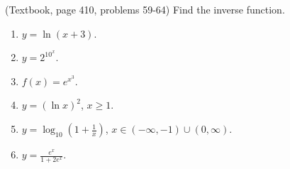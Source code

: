 \begin{problem} (Textbook, page 410, problems 59-64)
Find the inverse function. 
\begin{multicols}{2}
\begin{enumerate}
\item $y=\ln (x+3)$.

\item $y=2^{10^x}$.

\item $f(x)=e^{x^3}$.

\item $y=(\ln x)^2$, $x\geq 1$.

\item $y=\log_{10}\left(1+\frac{1}{x} \right)$, $x\in (-\infty, -1)\cup (0, \infty)$.

\item $y=\frac{e^x}{1+2e^x}$.

\end{enumerate}
\end{multicols}
\end{problem}
